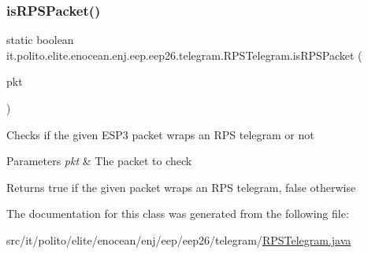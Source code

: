 \subsubsection{\texorpdfstring{is\+R\+P\+S\+Packet()}{isRPSPacket()}}
{\footnotesize\ttfamily static boolean it.\+polito.\+elite.\+enocean.\+enj.\+eep.\+eep26.\+telegram.\+R\+P\+S\+Telegram.\+is\+R\+P\+S\+Packet (\begin{DoxyParamCaption}\item[{\hyperlink{classit_1_1polito_1_1elite_1_1enocean_1_1protocol_1_1serial_1_1v3_1_1network_1_1packet_1_1_e_s_p3_packet}{E\+S\+P3\+Packet}}]{pkt }\end{DoxyParamCaption})\hspace{0.3cm}{\ttfamily [static]}}

Checks if the given E\+S\+P3 packet wraps an R\+PS telegram or not 
\begin{DoxyParams}{Parameters}
{\em pkt} & The packet to check \\
\hline
\end{DoxyParams}
\begin{DoxyReturn}{Returns}
true if the given packet wraps an R\+PS telegram, false otherwise 
\end{DoxyReturn}


The documentation for this class was generated from the following file\+:\begin{DoxyCompactItemize}
\item 
src/it/polito/elite/enocean/enj/eep/eep26/telegram/\hyperlink{_r_p_s_telegram_8java}{R\+P\+S\+Telegram.\+java}\end{DoxyCompactItemize}
